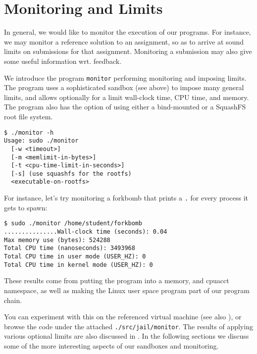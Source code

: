 
\section{Monitoring and Limits}

\label{section:assessment-engine:monitoring-and-limits}

In general, we would like to monitor the execution of our programs. For
instance, we may monitor a reference solution to an assignment, so as to arrive
at sound limits on submissions for that assignment. Monitoring a submission may
also give some useful information wrt. feedback.

We introduce the program \texttt{monitor} performing monitoring and imposing
limits. The program uses a sophisticated sandbox (see above) to impose many
general limits, and allows optionally for a limit wall-clock time, CPU time,
and memory.  The program also has the option of using either a bind-mounted or
a SquashFS root file system.

\begin{lstlisting}
$ ./monitor -h
Usage: sudo ./monitor
  [-w <timeout>]
  [-m <memlimit-in-bytes>]
  [-t <cpu-time-limit-in-seconds>]
  [-s] (use squashfs for the rootfs)
  <executable-on-rootfs>
\end{lstlisting}

For instance, let's try monitoring a forkbomb that prints a \texttt{.} for
every process it gets to spawn:

\begin{lstlisting}
$ sudo ./monitor /home/student/forkbomb
...............Wall-clock time (seconds): 0.04
Max memory use (bytes): 524288
Total CPU time (nanoseconds): 3493968
Total CPU time in user mode (USER_HZ): 0
Total CPU time in kernel mode (USER_HZ): 0
\end{lstlisting}

These results come from putting the program into a memory, and cpuacct
namespace, as well as making the \cite{man-1-time} Linux user space program
part of our program chain.

You can experiment with this on the referenced virtual machine (see also
), or browse the code under the attached
\texttt{./src/jail/monitor}. The results of applying various optional limits
are also discussed in . In the following sections we
discuss some of the more interesting aspects of our sandboxes and monitoring.
